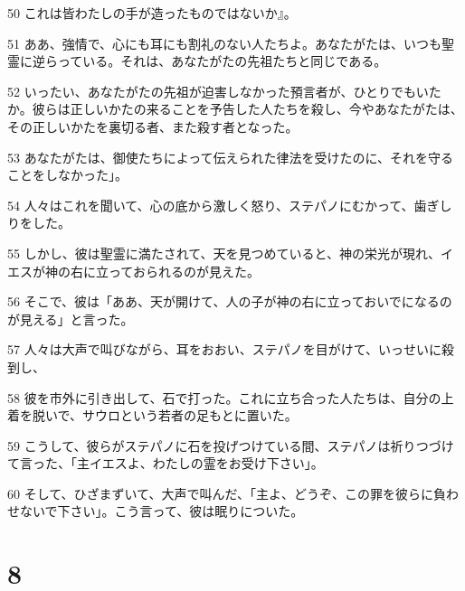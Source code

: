 \par 50 これは皆わたしの手が造ったものではないか』。
\par 51 ああ、強情で、心にも耳にも割礼のない人たちよ。あなたがたは、いつも聖霊に逆らっている。それは、あなたがたの先祖たちと同じである。
\par 52 いったい、あなたがたの先祖が迫害しなかった預言者が、ひとりでもいたか。彼らは正しいかたの来ることを予告した人たちを殺し、今やあなたがたは、その正しいかたを裏切る者、また殺す者となった。
\par 53 あなたがたは、御使たちによって伝えられた律法を受けたのに、それを守ることをしなかった」。
\par 54 人々はこれを聞いて、心の底から激しく怒り、ステパノにむかって、歯ぎしりをした。
\par 55 しかし、彼は聖霊に満たされて、天を見つめていると、神の栄光が現れ、イエスが神の右に立っておられるのが見えた。
\par 56 そこで、彼は「ああ、天が開けて、人の子が神の右に立っておいでになるのが見える」と言った。
\par 57 人々は大声で叫びながら、耳をおおい、ステパノを目がけて、いっせいに殺到し、
\par 58 彼を市外に引き出して、石で打った。これに立ち合った人たちは、自分の上着を脱いで、サウロという若者の足もとに置いた。
\par 59 こうして、彼らがステパノに石を投げつけている間、ステパノは祈りつづけて言った、「主イエスよ、わたしの霊をお受け下さい」。
\par 60 そして、ひざまずいて、大声で叫んだ、「主よ、どうぞ、この罪を彼らに負わせないで下さい」。こう言って、彼は眠りについた。

\chapter{8}

